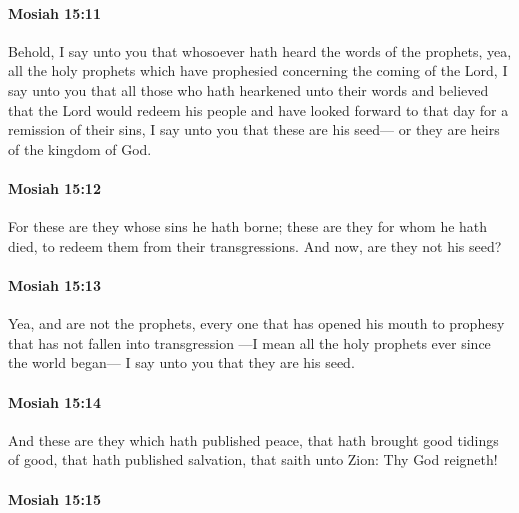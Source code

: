 		\paragraph{Mosiah 15:11} %
			\label{MOSIAH-15-11}

			Behold, I say unto you that
			whosoever hath heard the words of the prophets,
			yea, all the holy prophets which have prophesied
			concerning the coming of the Lord,
			I say unto you that all those who hath hearkened unto their words
			and believed that the Lord would redeem his people
			and have looked forward to that day for a remission of their sins,
			I say unto you that these are his seed---
			or they are heirs of the kingdom of God.

		\paragraph{Mosiah 15:12} %
			\label{MOSIAH-15-12}

			For these are they whose sins he hath borne;
			these are they for whom he hath died,
			to redeem them from their transgressions.
			And now, are they not his seed?

		\paragraph{Mosiah 15:13} %
			\label{MOSIAH-15-13}

			Yea, and are not the prophets,
			every one that has opened his mouth to prophesy
			that has not fallen into transgression
			---I mean all the holy prophets ever since the world began---
			I say unto you that they are his seed.

		\paragraph{Mosiah 15:14} %
			\label{MOSIAH-15-14}

			And these are they which hath published peace,
			that hath brought good tidings of good,
			that hath published salvation,
			that saith unto Zion:
			Thy God reigneth!

		\paragraph{Mosiah 15:15} %
			\label{MOSIAH-15-15}

